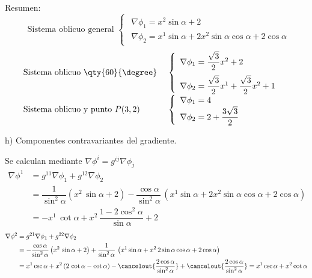 \noindent
Resumen:
\[
  \hspace{1em}
  \text{Sistema oblicuo general }
  \begin{cases}
    \begin{array}{l}
      \nabla\phi_1 = x^2\sin\alpha + 2\\
      \nabla\phi_2 = x^1\sin\alpha + 2x^2\sin\alpha\cos\alpha + 2 \cos\alpha
    \end{array}
  \end{cases}
\]
\[
  \begin{array}{ll}
    \text{Sistema oblicuo \qty{60}{\degree} } &
    \begin{cases}
      \begin{array}{l}
        \nabla\phi_1 = \dfrac{\sqrt{3}}{2} x^2 + 2\\[2ex]
        \nabla\phi_2 =\dfrac{\sqrt{3}}{2} x^1 + \dfrac{\sqrt{3}}{2} x^2 + 1
      \end{array}
    \end{cases}\\[2ex]
    \text{Sistema oblicuo y punto } P(3,2) &
    \begin{cases}
      \begin{array}{l}
        \nabla\phi_1 = 4\\
        \nabla\phi_2 = 2 + \dfrac{3\sqrt{3}}{2}
      \end{array}
    \end{cases}
  \end{array}
\]

\noindent
h) Componentes contravariantes del gradiente.

\vspace*{1ex}
Se calculan mediante $\nabla\phi^i = g^{ij} \nabla\phi_j$
\begin{align*}
  \nabla\phi^1
  &=
    g^{11} \nabla\phi_1 + g^{12}\nabla\phi_2\\
  &=
    \dfrac{1}{\sin^2\alpha} \left(x^2\,\sin\alpha + 2\right)
    - \dfrac{\cos\alpha}{\sin^2\alpha}
    \,\left(x^1\sin\alpha
    + 2x^2\sin\alpha\cos\alpha
    + 2\cos\alpha\right)\\
  &=
    - x^1\,\cot\alpha
    + x^2\,\dfrac{1-2\cos^2\alpha}{\sin\alpha}
    + 2
\end{align*}
\begin{align*}
  \nabla\phi^2
  &=
    g^{21} \nabla\phi_1 + g^{22}\nabla\phi_2\\
  &=
    -\dfrac{\cos\alpha}{\sin^2\alpha} \left(x^2\,\sin\alpha + 2\right)
    + \dfrac{1}{\sin^2\alpha}
    \,\left(x^1\sin\alpha
    + x^2\,2\sin\alpha\cos\alpha
    + 2\cos\alpha\right)\\
  &=
    x^1\csc\alpha
    + x^2\left(%
    2\,\cot\alpha
    -\cot\alpha
    \right)
    - \cancelout{\dfrac{2\cos\alpha}{\sin^2\alpha}}
    + \cancelout{\dfrac{2\cos\alpha}{\sin^2\alpha}}
    = x^1\csc\alpha
    + x^2\cot\alpha
\end{align*}

